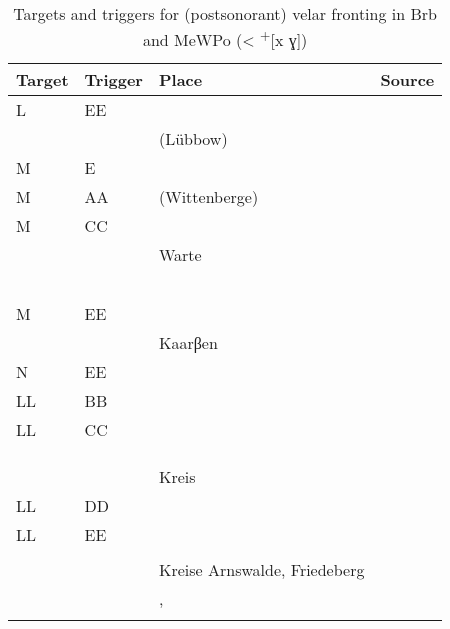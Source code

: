 \begin{table}
\caption{Targets and triggers for (postsonorant) velar fronting in Brb and MeWPo (< \textsuperscript{+}[x ɣ])\label{tab:12.19}}
\begin{tabularx}{\textwidth}{llQQ}
\lsptoprule
Target  & Trigger & Place & Source\\\midrule
L & EE &   & \citet{Selmer1918}\\
  &    &   (Lübbow) & \citet{Götze1922}\\
M & E &   & \citet{Bathe1932}\\
M & AA &   (Wittenberge) & \citet{Bretschneider1951}\\
M & CC &      & \citet{Teuchert1907a,Teuchert1907b} \\
  &    &Warte               &  \citet{Teuchert1907c}              \\
  &    &                &  \citet{Siewert1907}                \\
  &    &               &  \citet{Seelmann1908}               \\
  &    &              &  \citet{Siewert1912}                \\
  &    &        &  \citet{Teuchert1934}               \\
  &    &           &  \citet{Schönfeld1989}\\
M & EE &  &   \citet{Krause1895}      \\
  &    &  Kaarβen &       \citet{Dützmann1932}\\
N & EE &   & \citet{Kolz1914}\\
LL & BB &   & \citet{Warnkross1912}\\
LL & CC &        & \citet{Blume1933, Blume1933b, Blume1933c, Blume1933d}        \\
   &    &      &  \citet{Törnqvist1949}   \\
   &    &    &  \citet{Teuchert1964}    \\
   &    &     &  \citet{Schönfeld1965}   \\
   &    &   Kreis &  \citet{BethgeBonnin1969}\\
LL & DD &   & \citet{Jacobs1925a,Jacobs1925b,Jacobs1926}\\
LL & EE &             &  \citet{Holst1907}    \\
   &    &                           &   \citet{GSchmidt1912}\\
   &    & Kreise Arnswalde, Friedeberg  &   \citet{Seelmann1913}\\
   &    &  ,  &            \citet{Prowatke1973}\\
\lspbottomrule
\end{tabularx}
\end{table}


